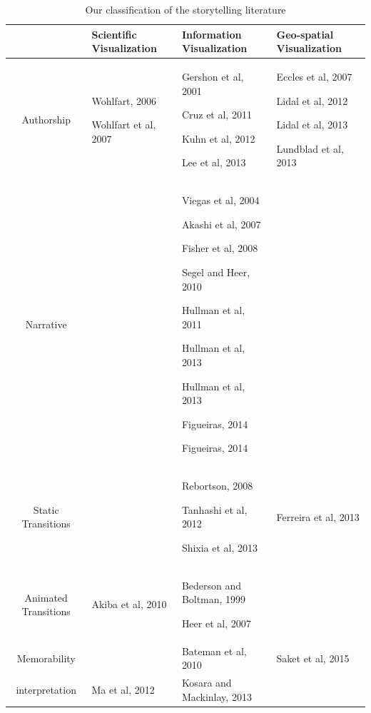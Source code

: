 \documentclass{egpubl}
\begin{document}
\begin{table}[htbp]
\centering
\caption{Our classification of the storytelling literature} 
\centering 
\begin{tabular}{|c| p{4cm}| p{5cm}|p{4cm}|} 
\hline
 & Scientific Visualization & Information Visualization & Geo-spatial Visualization\\ 
\hline
Authorship & Wohlfart, 2006 \cite{wohlfat}\par Wohlfart et al, 2007\cite{wohlfart2} \par & Gershon et al, 2001\cite{Gershon2}\par Cruz et al, 2011 \cite{cruz2011} \par Kuhn et al, 2012\cite{kuhn2012} \par  Lee et al, 2013\cite{lee2013} \par & Eccles et al, 2007\cite{eccles2007} \par  Lidal et al, 2012 \cite{lidal}  \par Lidal et al, 2013\cite{Lidal2013} \par Lundblad et al, 2013\cite{lundblad2013} \par\\
\hline 
Narrative & & Viegas et al, 2004\cite{viegas2004}\par Akashi et al, 2007\cite{akaishi2007narrative} \par Fisher et al, 2008\cite{fisher} \par Segel and Heer, 2010\cite{segal}\par  Hullman et al, 2011\cite{hullman} \par Hullman et al, 2013 \cite{hullman2013} \par Hullman et al, 2013 \cite{hullman2013deeper} \par Figueiras, 2014 \cite{figueiras} \par Figueiras, 2014 \cite{figueiras2014tell}&\\ 
\hline
Static Transitions & & Rebortson, 2008\cite{Rebortson} \par  Tanhashi et al, 2012\cite{Tanahashi} \par Shixia et al, 2013\cite{shixia} & Ferreira et al, 2013\cite{ferreira2013} \par \\ 
\hline
Animated Transitions & Akiba et al, 2010\cite{Akiba} \par & Bederson and Boltman, 1999\cite{bedrson}\par Heer et al, 2007 \cite{heer2007} \par &\\
\hline
Memorability & &  Bateman et al, 2010\cite{bateman} \par & Saket et al, 2015 \cite{saket2015} \par\\ 
\hline
interpretation &  Ma et al, 2012\cite{sci} \par  &  Kosara and Mackinlay, 2013\cite{Kosara} \par & \\
\hline
\end{tabular}
\label{table:classification1} 
\end{table}
\end{document}
